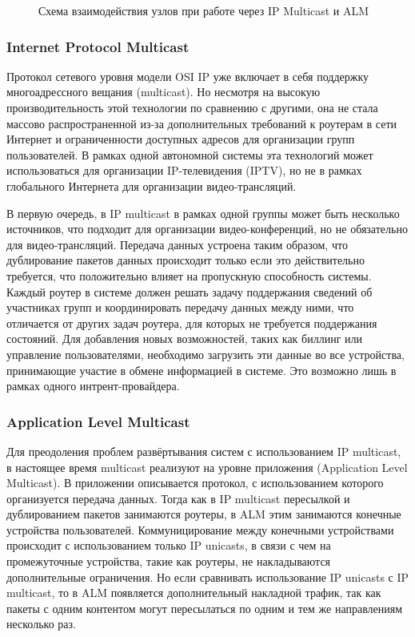 	\begin{figure}[h]
		\caption{Схема взаимодействия узлов при работе через IP Multicast и ALM}
		\label{img:ip-multicast-vs-application-multicast}
	\end{figure}

		\subsubsection{Internet Protocol Multicast}
		Протокол сетевого уровня модели OSI IP уже включает в себя поддержку многоадрессного вещания
		(multicast). Но несмотря на высокую производительность этой технологии по сравнению с другими, она не
		стала массово распространенной из-за дополнительных требований к роутерам в сети Интернет и ограниченности
		доступных адресов для организации групп пользователей. В рамках одной автономной системы эта технологий может
		использоваться для организации IP-телевидения (IPTV), но не в рамках глобального Интернета для организации
		видео-трансляций.

		В первую очередь, в IP multicast в рамках одной группы может быть несколько источников, что подходит
		для организации видео-конференций, но не обязательно для видео-трансляций. Передача данных устроена таким
		образом, что дублирование пакетов данных происходит только если это действительно требуется, что положительно
		влияет на пропускную способность системы. Каждый роутер в системе должен решать задачу поддержания сведений об
		участниках групп и координировать передачу данных между ними, что отличается от других задач роутера, для
		которых не требуется поддержания состояний. Для добавления новых возможностей, таких как биллинг или управление
		пользователями, необходимо загрузить эти данные во все устройства, принимающие участие в обмене информацией в
		системе. Это возможно лишь в рамках одного интрент-провайдера.

		\subsubsection{Application Level Multicast}
		Для преодоления проблем развёртывания систем с использованием IP multicast, в настоящее время multicast
		реализуют на уровне приложения (Application Level Multicast). В приложении описывается протокол, с
		использованием которого организуется передача данных. Тогда как в IP multicast пересылкой и дублированием
		пакетов занимаются роутеры, в ALM этим занимаются конечные устройства пользователей. Коммуницирование между
		конечными устройствами происходит с использованием только IP unicasts, в связи с чем на промежуточные устройства,
		такие как роутеры, не накладываются дополнительные ограничения. Но если сравнивать использование IP unicasts с
		IP multicast, то в ALM появляется дополнительный накладной трафик, так как пакеты с одним контентом могут
		пересылаться по одним и тем же направлениям несколько раз.

